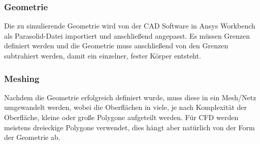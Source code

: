 \subsubsection*{Geometrie}
\label{subsubsec:geometry_cfd}
Die zu simulierende Geometrie wird von der CAD Software in Ansys Workbench als Parasolid-Datei importiert und anschließend angepasst. Es müssen Grenzen definiert werden und die Geometrie muss anschließend von den Grenzen subtrahiert werden, damit ein einzelner, fester Körper entsteht.

\subsubsection*{Meshing}
\label{subsubsec:meshing_cfd}
Nachdem die Geometrie erfolgreich definiert wurde, muss diese in ein Mesh/Netz umgewandelt werden, wobei die Oberflächen in viele, je nach Komplexität der Oberfläche, kleine oder große Polygone aufgeteilt werden. Für CFD werden meistens dreieckige Polygone verwendet, dies hängt aber natürlich von der Form der Geometrie ab.

